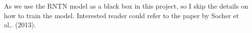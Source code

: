 As we use the RNTN model as a black box in this project, so I skip the details on how to train the model. Interested reader could refer to the paper by Socher et al,. (2013). 



